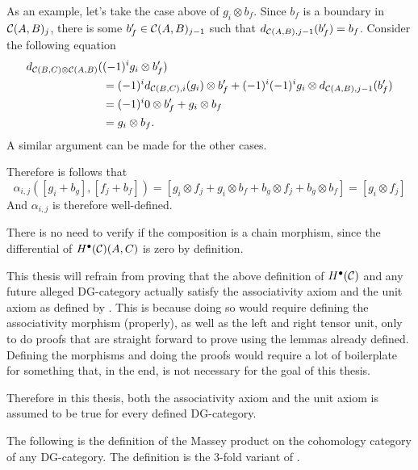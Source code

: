 \begin{remark}
\begin{enumerate}
{            As an example, let's take the case above of \( g_i \otimes b_f \). Since \( b_f \) is a boundary in \( {\mathcal{C}}(A, B)_j \), there is some \( b_f' \in {\mathcal{C}}(A, B)_{j - 1} \) such that \( d_{{\mathcal{C}}(A, B), j - 1}(b_f') = b_f \). Consider the following equation
            \begin{align*}
                d_{{\mathcal{C}}(B, C) \otimes {\mathcal{C}}(A, B)}(&(-1)^i g_i \otimes b_f') \\
                &= (-1)^i d_{{\mathcal{C}}(B, C), i}(g_i) \otimes b_f' + (-1)^i (-1)^i g_i \otimes d_{{\mathcal{C}}(A, B), j - 1}(b_f') \\
                &= (-1)^i 0 \otimes b_f' + g_i \otimes b_f \\
                &= g_i \otimes b_f.
            \end{align*}
            A similar argument can be made for the other cases.

            Therefore is follows that
            \[
                \alpha_{i, j}([g_i + b_g], [f_j + b_f]) = [g_i \otimes f_j + g_i \otimes b_f + b_g \otimes f_j + b_g \otimes b_f] = [g_i \otimes f_j]
            \]
            And \( \alpha_{i, j} \) is therefore well-defined.
        }
    \end{enumerate}
    There is no need to verify if the composition is a chain morphism, since the differential of \( H^\bullet({\mathcal{C}})(A, C) \) is zero by definition.
\end{remark}

This thesis will refrain from proving that the above definition of \( H^\bullet({\mathcal{C}}) \) and any future alleged DG-category actually satisfy the associativity axiom and the unit axiom as defined by \cite[Definition 6.2.1]{Borceux_1994}. This is because doing so would require defining the associativity morphism (properly), as well as the left and right tensor unit, only to do proofs that are straight forward to prove using the lemmas already defined. Defining the morphisms and doing the proofs would require a lot of boilerplate for something that, in the end, is not necessary for the goal of this thesis.

Therefore in this thesis, both the associativity axiom and the unit axiom is assumed to be true for every defined DG-category.

The following is the definition of the Massey product on the cohomology category of any DG-category. The definition is the 3-fold variant of \cite[Definition 4.2.1]{Jasso-Muro_2023}.

